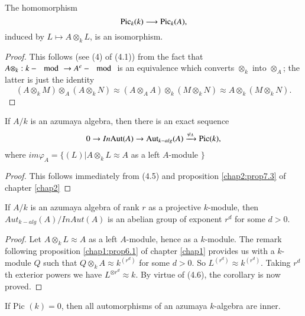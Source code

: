 \begin{coro} %
The homomorphism 
$$
\operatorname{Pic}_k (k) \longrightarrow \operatorname{Pic}_k (A),
$$
induced by $L \mapsto A \otimes_k L$, is an isomorphism.
 \end{coro}   

  \begin{proof}%
This follows (see (4) of (4.1)) from the fact that $A \otimes_k:k-
\mod \to A^e -\mod$ is an equivalence which converts $\otimes_k$ into
$\otimes_A$; the latter is just the identity  
$$
(A \otimes_k M) \otimes_A (A \otimes_k N) \approx (A \otimes_A A) 
\otimes_k (M \otimes_k N) \approx A \otimes_k (M \otimes_k N). 
$$
   \end{proof}

 \begin{coro} %
 If $A/k$ is an azumaya algebra, then there is an exact sequence
$$
0 \to In {\rm Aut}(A) \to {\rm Aut}_{k-alg} (A)
\xrightarrow{\varphi_A}  \operatorname{Pic} (k),  
$$
where $im \varphi_A= \bigg\{(L)| A\otimes_k L\approx A $ as a left
$A$-module $\bigg \}$ 
      \end{coro}      

\begin{proof}%
This follows immediately from (4.5) and proposition \ref{chap2:prop7.3}
of chapter \ref{chap2}
\end{proof}    

\begin{coro}%
If $A/k$ is an azumaya algebra of rank $r$ as a projective $k$-module,
then $Aut_{k-alg}(A) / In  Aut (A)$ is an abelian group\pageoriginale
of exponent $r^d$ for some $d > 0$. 
\end{coro}  
    
\begin{proof}%
Let $A \otimes_k L \approx A$ as a left $A$-module, hence as a
$k$-module. The remark following  proposition \ref{chap1:prop6.1} of
chapter \ref{chap1}  provides
us with a $k$-module $Q$ such that $Q \otimes_k A \approx k^{(r^d)}$ for
some $d > 0$. So $L^{(r^d)} \approx k^{(r^d)}$. Taking $r^d$th
exterior powers we have $L^{\otimes r^d} \approx k$. By virtue of
(4.6), the corollary is now proved. 
 \end{proof}       

\begin{coro}%
 If   Pic $(k) =0$, then all automorphisms of an azumaya
  $k$-algebra are inner. 
       \end{coro}       

